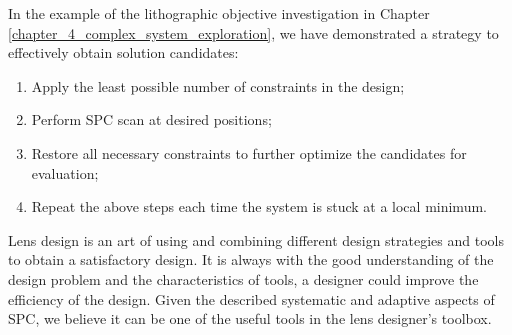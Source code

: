 In the example of the lithographic objective investigation in Chapter \ref{chapter_4_complex_system_exploration}, we have demonstrated a strategy to effectively obtain solution candidates:

\begin{enumerate}[nosep]
\item Apply the least possible number of constraints in the design;
\item Perform SPC scan at desired positions;
\item Restore all necessary constraints to further optimize the candidates for evaluation; 
\item Repeat the above steps each time the system is stuck at a local minimum.
\end{enumerate}


Lens design is an art of using and combining different design strategies and tools to obtain a satisfactory design. It is always with the good understanding of the design problem and the characteristics of tools, a designer could improve the efficiency of the design. Given the described systematic and adaptive aspects of SPC, we believe it can be one of the useful tools in the lens designer's toolbox.  

